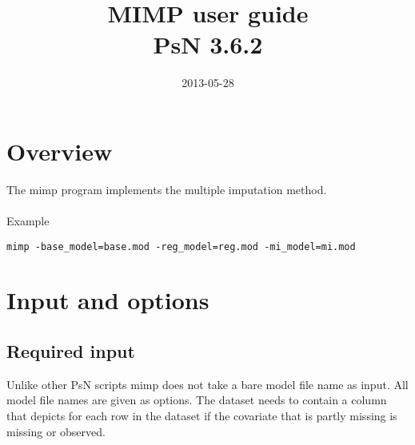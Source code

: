 \documentclass[a4paper,12pt]{article}
\title{MIMP user guide\\ \vspace{2 mm} {\large PsN 3.6.2}}
\date{2013-05-28}
\begin{document}
\maketitle


\section{Overview}
The mimp program implements the multiple imputation method\cite{Johansson}.
\\
\\
Example
\begin{verbatim}
mimp -base_model=base.mod -reg_model=reg.mod -mi_model=mi.mod
\end{verbatim}

\section{Input and options}

\subsection{Required input}
Unlike other PsN scripts mimp does not take a bare model file name as input. All model file names are given as options. The dataset needs to contain a column that depicts for each row in the dataset if the covariate that is partly missing is missing or observed.
\end{document}
